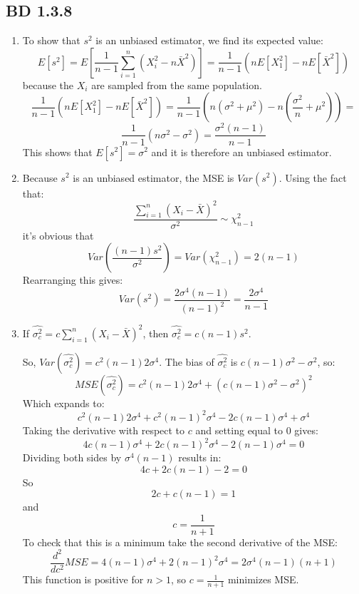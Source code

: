 \documentclass[a4paper,12pt]{article}
\begin{document}
\subsection{BD 1.3.8}
\begin{enumerate}
  \item To show that $s^2$ is an unbiased estimator, we find its expected value:$$E[s^2]=E[\frac{1}{n-1}\sum_{i=1}^{n}(X_i^2-n\bar{X}^2)]=\frac{1}{n-1}(nE[X_1^2]-nE[\bar{X}^2])$$ because the $X_i$ are sampled from the same population. $$\frac{1}{n-1}(nE[X_1^2]-nE[\bar{X}^2])=\frac{1}{n-1}(n(\sigma^2+\mu^2)-n(\frac{\sigma^2}{n}+\mu^2))=$$$$\frac{1}{n-1}(n\sigma^2-\sigma^2)=\frac{\sigma^2(n-1)}{n-1}$$
  This shows that $E[s^2]=\sigma^2$ and it is therefore an unbiased estimator.
  \item Because $s^2$ is an unbiased estimator, the MSE is $Var(s^2)$. Using the fact that: $$\frac{\sum_{i=1}^n(X_i-\bar{X})^2}{\sigma^2}\sim\chi_{n-1}^2$$ it's obvious that $$Var(\frac{(n-1)s^2}{\sigma^2})=Var(\chi_{n-1}^2)=2(n-1)$$
  Rearranging this gives:$$Var(s^2)=\frac{2\sigma^4(n-1)}{(n-1)^2}=\frac{2\sigma^4}{n-1}$$
  \item If $\hat{\sigma^2_c}=c\sum_{i=1}^n(X_i-\bar{X})^2$, then $\hat{\sigma^2_c}=c(n-1)s^2$.

  So, $Var(\hat{\sigma^2_c})=c^2(n-1)2\sigma^4$. The bias of $\hat{\sigma^2_c}$ is $c(n-1)\sigma^2-\sigma^2$, so:$$MSE(\hat{\sigma^2_c})=c^2(n-1)2\sigma^4+(c(n-1)\sigma^2-\sigma^2)^2$$
  Which expands to: $$c^2(n-1)2\sigma^4+c^2(n-1)^2\sigma^4-2c(n-1)\sigma^4+\sigma^4$$
  Taking the derivative with respect to $c$ and setting equal to 0 gives:
  $$4c(n-1)\sigma^4+2c(n-1)^2\sigma^4-2(n-1)\sigma^4=0$$
  Dividing both sides by $\sigma^4(n-1)$ results in:
  $$4c+2c(n-1)-2=0$$
  So $$2c+c(n-1)=1$$ and $$c=\frac{1}{n+1}$$
  To check that this is a minimum take the second derivative of the MSE:
  $$\frac{d^2}{dc^2}MSE=4(n-1)\sigma^4+2(n-1)^2\sigma^4=2\sigma^4(n-1)(n+1)$$
  This function is positive for $n>1$, so $c=\frac{1}{n+1}$ minimizes MSE.
\end{enumerate}
\end{document}
